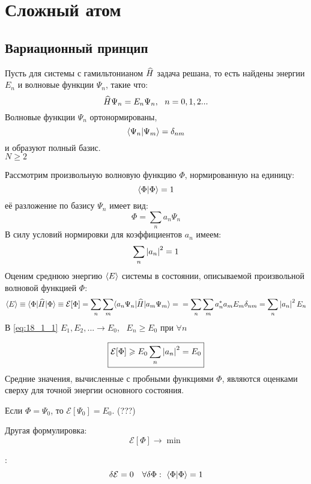 \chapter{Сложный атом}

\section{Вариационный принцип}

Пусть для системы с гамильтонианом $\widehat{H}$ задача решана, то есть найдены энергии $E_n$ и волновые функции $\Psi_n$, такие что:
$$
\widehat{H}\Psi_n = E_n \Psi_n,~~ n = 0,1,2...
$$
Волновые функции $\Psi_n$ ортонормированы,
$$
\langle{\Psi_n}|{\Psi_m}\rangle = \delta_{nm}
$$
и образуют полный базис.\\
$N \geqslant 2$

Рассмотрим произвольную волновую функцию $\Phi$, нормированную на единицу:
$$
\langle{\Phi}|{\Phi}\rangle = 1
$$
её разложение по базису $\Psi_n$ имеет вид:
$$
\Phi = \sum_n a_n \Psi_n
$$
В силу условий нормировки для коэффициентов $a_n$ имеем:
$$
\sum_n \left\lvert{a_n}\right\rvert^2 = 1
$$
Оценим среднюю энергию $\langle{E}\rangle$ системы в состоянии, описываемой произвольной волновой функцией $\Phi$:
\begin{equation}
\label{eq:18_1_1}
\langle{E}\rangle \equiv \langle{\Phi}|{\widehat{H}}|{\Phi}\rangle \equiv \mathcal{E}[\Phi] = \sum_n \sum_m \langle{a_n \Psi_n}|{\widehat{H}}|{a_m \Psi_m}\rangle = \\ = \sum_n \sum_m a_n^* a_m E_m \delta_{nm} = \sum_n \left\lvert{a_n}\right\rvert^2 E_n
\end{equation}
В \eqref{eq:18_1_1} $E_1, E_2, ... \to E_0$,~ $E_n \geqslant E_0$ при $\forall n$

\begin{equation}
\label{eq:18_1_2}
\boxed{\mathcal{E}[\Phi] \geqslant E_0 \sum_n \left\lvert{a_n}\right\rvert^2 = E_0}
\end{equation}
Средние значения, вычисленные с пробными функциями $\Phi$, являются оценками сверху для точной энергии основного состояния.

Если $\Phi = \Psi_0$, то $\mathcal{E}[\Psi_0] = E_0$. (???)

Другая формулировка:
\begin{equation}
\label{eq:18_1_3}
\mathcal{E}[\Phi] \to \min
\end{equation}

:
\begin{equation}
\label{eq:18_1_4}
\delta \mathcal{E} = 0 ~~~ \forall \delta\Phi:~ \langle{\Phi}|{\Phi}\rangle = 1
\end{equation}

